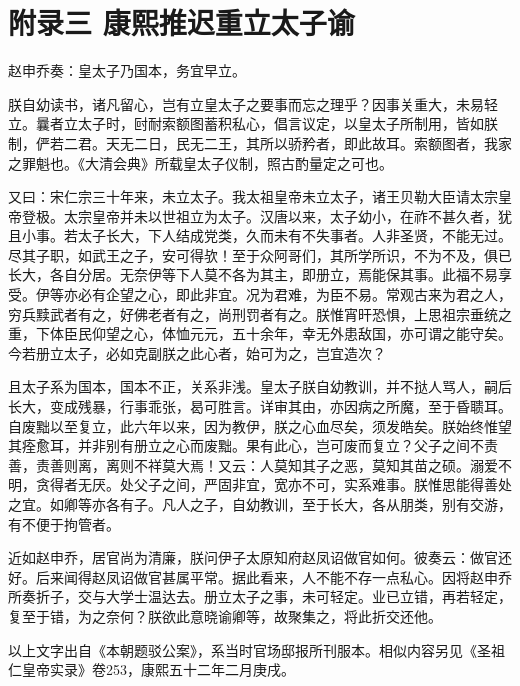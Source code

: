 \chapter*{附录三 康熙推迟重立太子谕}

赵申乔奏：皇太子乃国本，务宜早立。



朕自幼读书，诸凡留心，岂有立皇太子之要事而忘之理乎？因事关重大，未易轻立。曩者立太子时，尀耐索额图蓄积私心，倡言议定，以皇太子所制用，皆如朕制，俨若二君。天无二日，民无二王，其所以骄矜者，即此故耳。索额图者，我家之罪魁也。《大清会典》所载皇太子仪制，照古酌量定之可也。



又曰：宋仁宗三十年来，未立太子。我太祖皇帝未立太子，诸王贝勒大臣请太宗皇帝登极。太宗皇帝并未以世祖立为太子。汉唐以来，太子幼小，在祚不甚久者，犹且小事。若太子长大，下人结成党类，久而未有不失事者。人非圣贤，不能无过。尽其子职，如武王之子，安可得欤！至于众阿哥们，其所学所识，不为不及，俱已长大，各自分居。无奈伊等下人莫不各为其主，即册立，焉能保其事。此福不易享受。伊等亦必有企望之心，即此非宜。况为君难，为臣不易。常观古来为君之人，穷兵黩武者有之，好佛老者有之，尚刑罚者有之。朕惟宵旰恐惧，上思祖宗垂统之重，下体臣民仰望之心，体恤元元，五十余年，幸无外患敌国，亦可谓之能守矣。今若册立太子，必如克副朕之此心者，始可为之，岂宜造次？



且太子系为国本，国本不正，关系非浅。皇太子朕自幼教训，并不挞人骂人，嗣后长大，变成残暴，行事乖张，曷可胜言。详审其由，亦因病之所魔，至于昏聩耳。自废黜以至复立，此六年以来，因为教伊，朕之心血尽矣，须发皓矣。朕始终惟望其痊愈耳，并非别有册立之心而废黜。果有此心，岂可废而复立？父子之间不责善，责善则离，离则不祥莫大焉！又云：人莫知其子之恶，莫知其苗之硕。溺爱不明，贪得者无厌。处父子之间，严固非宜，宽亦不可，实系难事。朕惟思能得善处之宜。如卿等亦各有子。凡人之子，自幼教训，至于长大，各从朋类，别有交游，有不便于拘管者。



近如赵申乔，居官尚为清廉，朕问伊子太原知府赵凤诏做官如何。彼奏云：做官还好。后来闻得赵凤诏做官甚属平常。据此看来，人不能不存一点私心。因将赵申乔所奏折子，交与大学士温达去。册立太子之事，未可轻定。业已立错，再若轻定，复至于错，为之奈何？朕欲此意晓谕卿等，故聚集之，将此折交还他。



以上文字出自《本朝题驳公案》，系当时官场邸报所刊服本。相似内容另见《圣祖仁皇帝实录》卷253，康熙五十二年二月庚戌。

